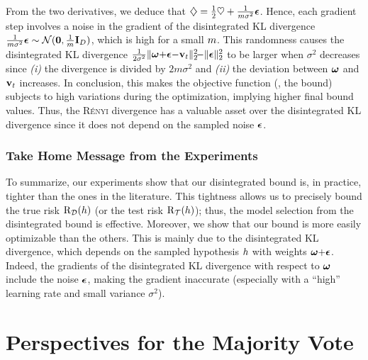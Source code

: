 From the two derivatives, we deduce that $\diamondsuit = \frac{1}{2}\heartsuit + \frac{1}{m\sigma^2}\boldsymbol{\epsilon}$.
Hence, each gradient step involves a noise in the gradient of the disintegrated KL divergence \mbox{$\frac{1}{m\sigma^2}\boldsymbol{\epsilon} \sim \mathcal{N}({\bf 0}, \frac{1}{m}\mathbf{I}_D)$}, which is high for a small $m$.
This randomness causes the disintegrated KL divergence $\frac{1}{2\sigma^2}\| \boldsymbol{\omega}{+}\boldsymbol{\epsilon}{-}\mathbf{v}_t\|^2_{2}\!{-}\|\boldsymbol{\epsilon}\|^2_{2}$ to be larger when $\sigma^2$ decreases since {\it (i)} the divergence is divided by $2m\sigma^2$ and {\it (ii)} the deviation between $\boldsymbol{\omega}$ and $\mathbf{v}_t$ increases.
In conclusion, this makes the objective function (\ie, the bound) subjects to high variations during the optimization, implying higher final bound values.
Thus, the \textsc{Rényi} divergence has a valuable asset over the disintegrated KL divergence since it does not depend on the sampled noise $\boldsymbol{\epsilon}$.

\subsubsection{Take Home Message from the Experiments}
To summarize, our experiments show that our disintegrated bound is, in practice, tighter than the ones in the literature.
This tightness allows us to precisely bound the true risk $\text{R}_{\mathcal{D}}(h)$ (or the test risk $\text{R}_{\mathcal{T}}(h)$); thus, the model selection from the disintegrated bound is effective.
Moreover, we show that our bound is more easily optimizable than the others. 
This is mainly due to the disintegrated KL divergence, which depends on the sampled hypothesis $h$ with weights $\boldsymbol{\omega}{+}\boldsymbol{\epsilon}$.
Indeed, the gradients of the disintegrated KL divergence with respect to $\boldsymbol{\omega}$ include the noise $\boldsymbol{\epsilon}$, making the gradient inaccurate (especially with a ``high'' learning rate and small variance $\sigma^2$).

\section{Perspectives for the Majority Vote}


